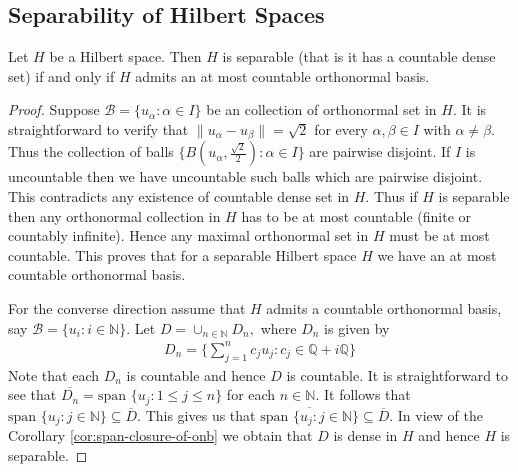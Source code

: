 \subsection{Separability of Hilbert Spaces}
\begin{proposition}
Let $H$ be a Hilbert space. Then $H$ is separable (that is it has a countable dense set) if and only if $H$ admits an at most countable orthonormal basis. 
\label{prop:separable-hilbert-spaces}
\end{proposition}
\begin{proof}
  Suppose $\mathcal B = \{u_{\alpha} : \alpha \in I\}$ be an collection of orthonormal set in $H.$ It is straightforward to verify that $\|u_{\alpha}-u_{\beta}\|= \sqrt{2}$ for every $\alpha,\beta\in I$ with $\alpha \neq \beta.$ Thus  the collection of balls $\{B(u_{\alpha},\frac{\sqrt{2}}{2}) : \alpha \in I\}$ are pairwise disjoint. If $I$ is uncountable then we have uncountable such balls  which are pairwise disjoint. This contradicts any existence of countable dense set in $H.$ Thus if $H$ is separable then any orthonormal collection in $H$ has to be at most countable (finite or countably infinite). Hence any maximal orthonormal set in $H$ must be at most countable. This proves that for a separable Hilbert space $H$ we have an at most countable orthonormal basis.

For the converse direction assume that $H$ admits a countable orthonormal basis, say $\mathcal B = \{u_{i} : i \in \mathbb N\}.$ Let $D = \cup_{n\in\mathbb N} D_n,$ where $D_n$ is given by
\begin{align*}
D_n= \Big\{ \sum\limits_{j=1}^n c_j u_j : c_j \in \mathbb Q + i \mathbb Q \Big\}
\end{align*}
Note that each $D_n$ is countable and hence $D$ is countable. It is  straightforward to see that $\overline{D_n} = \text{span } \{u_j : 1\leqslant j \leqslant n\}$ for each $n\in\mathbb N.$ It follows that $\text{span } \{u_j : j\in \mathbb N\} \subseteq \overline{D}.$ This gives us that $\overline{\text{span } \{u_j : j\in \mathbb N\}} \subseteq \overline{D}.$ In view of the Corollary \ref{cor:span-closure-of-onb} we obtain that $D$ is dense in $H$ and hence $H$ is separable.
\end{proof}


